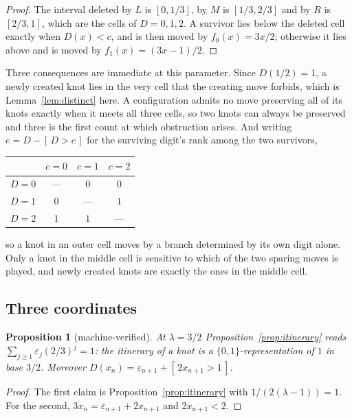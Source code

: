 \documentclass[11pt,reqno]{amsart}
\theoremstyle{plain}
\newtheorem{proposition}[theorem]{Proposition}
\theoremstyle{definition}
\theoremstyle{remark}
\begin{document}
\begin{proof}
The interval deleted by $L$ is $[0,1/3]$, by $M$ is $[1/3,2/3]$ and by $R$ is
$[2/3,1]$, which are the cells of $D=0,1,2$. A survivor lies below the deleted
cell exactly when $D(x)<c$, and is then moved by $f_0(x)=3x/2$; otherwise it
lies above and is moved by $f_1(x)=(3x-1)/2$.
\end{proof}

Three consequences are immediate at this parameter. Since $D(1/2)=1$, a newly
created knot lies in the very cell that the creating move forbids, which is
Lemma~\ref{lem:distinct} here. A configuration admits no move preserving all of
its knots exactly when it meets all three cells, so two knots can always be
preserved and three is the first count at which obstruction arises. And writing
$e=D-[\,D>c\,]$ for the surviving digit's rank among the two survivors,

\begin{center}
\begin{tabular}{lccc}
\toprule
 & $c=0$ & $c=1$ & $c=2$\\
\midrule
$D=0$ & --- & $0$ & $0$\\
$D=1$ & $0$ & --- & $1$\\
$D=2$ & $1$ & $1$ & ---\\
\bottomrule
\end{tabular}
\end{center}

so a knot in an outer cell moves by a branch determined by its own digit alone.
Only a knot in the middle cell is sensitive to which of the two sparing moves is
played, and newly created knots are exactly the ones in the middle cell.

\subsection{Three coordinates}

\begin{proposition}[machine-verified]\label{prop:base32}
At $\lambda=3/2$ Proposition~\ref{prop:itinerary} reads
$\sum_{j\geq1}\varepsilon_j(2/3)^{j}=1$: the itinerary of a knot is a
$\{0,1\}$-representation of $1$ in base $3/2$. Moreover
$D(x_n)=\varepsilon_{n+1}+[\,2x_{n+1}>1\,]$.
\end{proposition}

\begin{proof}
The first claim is Proposition~\ref{prop:itinerary} with
$1/(2(\lambda-1))=1$. For the second, $3x_n=\varepsilon_{n+1}+2x_{n+1}$ and
$2x_{n+1}<2$.
\end{proof}
\end{document}
